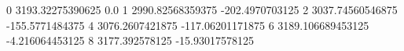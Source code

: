 0 3193.32275390625 0.0
1 2990.82568359375 -202.4970703125
2 3037.74560546875 -155.5771484375
4 3076.2607421875 -117.06201171875
6 3189.106689453125 -4.216064453125
8 3177.392578125 -15.93017578125
